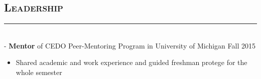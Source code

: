 \documentclass[11pt]{res}
\newcommand{\style}[1]{\color{Blue}\large\textsc{#1}}
\begin{document}
\begin{resume}
   

\section{\style{Leadership}}
  \vspace{-10pt}
\rule{18cm}{0.5mm}\\
 -\sectionwidth \resumewidth
 \textbf{Mentor} of CEDO Peer-Mentoring Program in University of Michigan \hfill{Fall 2015}  \hspace{-0.58in}\vspace{-0mm}
   \begin{itemize}[leftmargin=-0.1in]
  \item Shared academic and work experience and guided freshman protege for the whole semester
   \end{itemize}\vspace{-15pt}
   

\end{resume}
\end{document}
